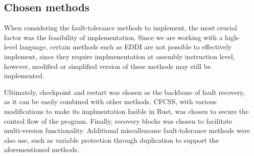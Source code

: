 \subsection{Chosen methods}

When considering the fault-tolerance methods to implement, the most crucial factor was the feasibility of implementation. Since we are working with a high-level language, certain methods such as EDDI are not possible to effectively implement, since they require implmenentation at assembly instruction level, however, modified or simplified version of these methods may still be implemented.

Ultimately, checkpoint and restart was chosen as the backbone of fault recovery, as it can be easily combined with other methods. CFCSS, with various modifications to make its implmentation fasible in Rust, was chosen to secure the control flow of the program. Finally, recovery blocks was chosen to facilitate multi-version functionality. Additional miscallenouse fault-tolerance methods were also use, such as variable protection through duplication to support the aforementioned methods.